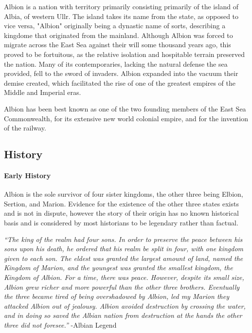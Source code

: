 
	Albion is a nation with territory primarily consisting primarily of the island of Albia, of western Ullr.  The island takes its name from the state, as opposed to vice versa, "Albion" originally being a dynastic name of sorts, describing a kingdome that originated from the mainland.  Although Albion was forced to migrate across the East Sea against their will some thousand years ago, this proved to be fortuitous, as the relative isolation and hospitable terrain preserved the nation.  Many of its contemporaries, lacking the natural defense the sea provided, fell to the sword of invaders.  Albion expanded into the vacuum their demise created, which facilitated the rise of one of the greatest empires of the Middle and Imperial eras.

	Albion has been best known as one of the two founding members of the East Sea Commonwealth, for its extensive new world colonial empire, and for the invention of the railway.
	
\subsection{History} 
	
	\paragraph{Early History}
	Albion is the sole survivor of four sister kingdoms, the other three being Elbion, Sertion, and Marion.  Evidence for the existence of the other three states exists and is not in dispute, however the story of their origin has no known historical basis and is considered by most historians to be legendary rather than factual.

	\textit{``The king of the realm had four sons.  In order to preserve the peace between his sons upon his death, he ordered that his realm be split in four, with one kingdom given to each son.  The eldest was granted the largest amount of land, named the Kingdom of Marion, and the youngest was granted the smallest kingdom, the Kingdom of Albion.  For a time, there was peace.  However, despite its small size, Albion grew richer and more powerful than the other three brothers.  Eventually the three became tired of being overshadowed by Albion, led my Marion they attacked Albion out of jealousy.  Albion avoided destruction by crossing the water, and in doing so saved the Albian nation from destruction at the hands the other three did not foresee.''} -Albian Legend

